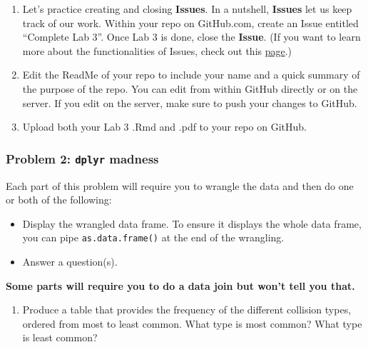\documentclass[]{article}
\newenvironment{Shaded}{\begin{snugshade}}{\end{snugshade}}
\newcommand{\KeywordTok}[1]{\textcolor[rgb]{0.13,0.29,0.53}{\textbf{#1}}}
\newcommand{\StringTok}[1]{\textcolor[rgb]{0.31,0.60,0.02}{#1}}
\newcommand{\OperatorTok}[1]{\textcolor[rgb]{0.81,0.36,0.00}{\textbf{#1}}}
\newcommand{\NormalTok}[1]{#1}
\providecommand{\tightlist}{%
  \setlength{\itemsep}{0pt}\setlength{\parskip}{0pt}}
\begin{document}
\begin{enumerate}
\def\labelenumi{\alph{enumi}.}
\item
  Let's practice creating and closing \textbf{Issues}. In a nutshell,
  \textbf{Issues} let us keep track of our work. Within your repo on
  GitHub.com, create an Issue entitled ``Complete Lab 3''. Once Lab 3 is
  done, close the \textbf{Issue}. (If you want to learn more about the
  functionalities of Issues, check out this
  \href{https://guides.github.com/features/issues/}{page}.)
\item
  Edit the ReadMe of your repo to include your name and a quick summary
  of the purpose of the repo. You can edit from within GitHub directly
  or on the server. If you edit on the server, make sure to push your
  changes to GitHub.
\item
  Upload both your Lab 3 .Rmd and .pdf to your repo on GitHub.
\end{enumerate}

\subsubsection{\texorpdfstring{Problem 2: \texttt{dplyr}
madness}{Problem 2: dplyr madness}}\label{problem-2-dplyr-madness}

Each part of this problem will require you to wrangle the data and then
do one or both of the following:

\begin{itemize}
\tightlist
\item
  Display the wrangled data frame. To ensure it displays the whole data
  frame, you can pipe \texttt{as.data.frame()} at the end of the
  wrangling.
\item
  Answer a question(s).
\end{itemize}

\textbf{Some parts will require you to do a data join but won't tell you
that.}

\begin{enumerate}
\def\labelenumi{\alph{enumi}.}
\tightlist
\item
  Produce a table that provides the frequency of the different collision
  types, ordered from most to least common. What type is most common?
  What type is least common?
\end{enumerate}

\begin{Shaded}
\end{Shaded}
\end{document}
